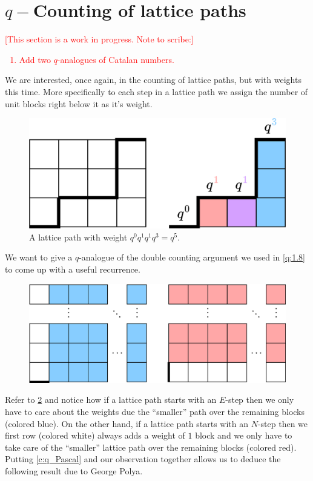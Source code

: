 \section{\texorpdfstring{$q-$}-Counting of lattice paths}
\textcolor{red}{[This section is a work in progress. Note to scribe:]
\begin{enumerate}
    \item Add two $q$-analogues of Catalan numbers.
\end{enumerate}
}
We are interested, once again, in the counting of lattice paths, but with weights this time. More specifically to each step in a lattice path we assign the number of unit blocks right below it as it's weight. 
\begin{figure}[H]
    \centering
    \includegraphics[width=0.65\linewidth]{Images/Figure27.png}
    \caption{A lattice path with weight $q^0q^1q^1q^3=q^5$.}
    \label{f:F2L}
\end{figure}
We want to give a $q$-analogue of the double counting argument we used in \cref{q:1.8} to come up with a useful recurrence. 
\begin{figure}[H]
    \centering
    \includegraphics[width=0.65\linewidth]{Images/Figure28.png}
    \caption{}
    \label{fig:Cayley_Rec}
\end{figure}
Refer to \cref{fig:Cayley_Rec} and notice how if a lattice path starts with an $E$-step then we only have to care about the weights due the ``smaller'' path over the remaining blocks (colored blue). On the other hand, if a lattice path starts with an $N$-step then we first row (colored white) always adds a weight of $1$ block and we only have to take care of the ``smaller'' lattice path over the remaining blocks (colored red). Putting \cref{c:q_Pascal} and our observation together allows us to deduce the following result due to George Polya.
